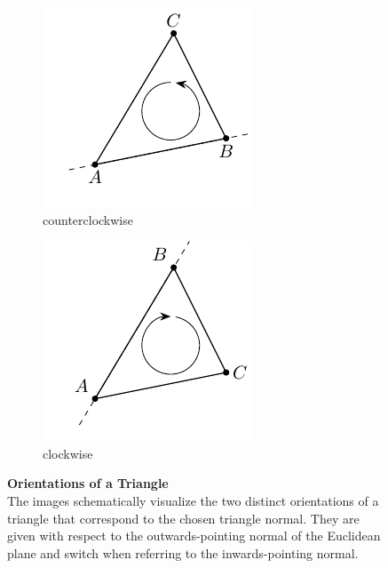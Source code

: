 \documentclass{stdlocal}
\begin{document}
  \begin{figure}[h]
    \centering
    \begin{subfigure}[b]{0.49\linewidth}
      \centering
      \includegraphics[width=0.7\linewidth]{figures/triangle-counterclockwise.pdf}
      \caption{counterclockwise}
    \end{subfigure}
    \begin{subfigure}[b]{0.49\linewidth}
      \centering
      \includegraphics[width=0.7\linewidth]{figures/triangle-clockwise.pdf}
      \caption{clockwise}
    \end{subfigure}
    \caption[Orientations of a Triangle]{%
      \textbf{Orientations of a Triangle}\\
      The images schematically visualize the two distinct orientations of a triangle that correspond to the chosen triangle normal.
      They are given with respect to the outwards-pointing normal of the Euclidean plane and switch when referring to the inwards-pointing normal.
    }
    \label{fig:triangle-orientations}
  \end{figure}
\end{document}
